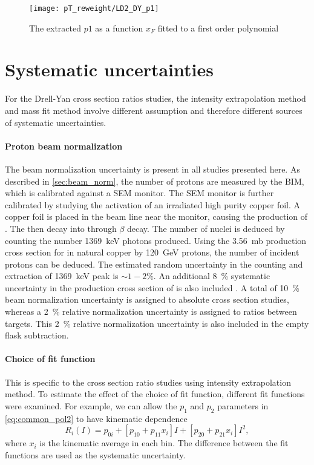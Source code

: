 \documentclass[../main.tex]{subfiles}
\begin{document}
\begin{figure}[h!]
	\centering
	\texttt{[image: pT\_reweight/LD2\_DY\_p1]}
	\caption{The extracted $p1$ as a function $x_F$ fitted to a first order polynomial}
\end{figure}

\section{Systematic uncertainties}
For the Drell-Yan cross section ratios studies, the intensity extrapolation method and mass fit
method involve different assumption and therefore different sources of systematic uncertainties.
\paragraph{Proton beam normalization}
The beam normalization uncertainty is present in all studies presented here.
As described in \cref{sec:beam_norm}, the number of protons are measured by the BIM, which is
calibrated against a SEM monitor. The SEM monitor is further calibrated by studying the activation of
an irradiated high purity copper foil. A copper foil is placed in the beam line near the monitor,
causing the production of . The  then decay into  through $\beta$
decay. The number of   nuclei is deduced by counting the number \SI{1369}{\keV} photons
produced. Using the \SI{3.56}{\milli\barn} production cross section for  in natural
copper  by \SI{120}{\GeV} protons, the number of incident protons can be deduced. The estimated
random uncertainty in the counting and extraction of \SI{1369}{\keV} peak is $\sim 1-2\%$.
An additional \SI{8}{\percent} systematic uncertainty in the production cross section of 
is also included \cite{docdb-457,docdb-7708}.
A total of \SI{10}{\percent} beam normalization uncertainty is assigned to absolute cross
section studies, whereas a \SI{2}{\percent} relative normalization uncertainty is assigned to ratios between
targets. This \SI{2}{\percent} relative normalization uncertainty is also included in the empty flask
subtraction.

\paragraph{Choice of fit function}
This is specific to the cross section ratio studies using intensity extrapolation method.
To estimate the effect of the choice of fit function, different fit functions were examined.
For example, we can allow the $p_1$ and $p_2$ parameters in \cref{eq:common_pol2} to have kinematic
dependence
\begin{equation}
	R_i \left(I\right) = p_{0i} + \left[p_{10}+p_{11}x_i\right] I + \left[p_{20}+p_{21}x_i\right] I^2,
\end{equation}
where $x_i$ is the kinematic average in each bin. The difference between the fit functions are used
as the systematic uncertainty.
\end{document}
